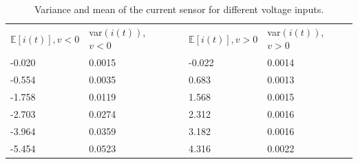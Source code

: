\def\arraystretch{1.2}
\begin{table}[]
\centering
\caption{Variance and mean of the current sensor for different voltage inputs.}
\label{my-label}
\begin{tabular}{lllll}
\cline{1-2} \cline{4-5}
\multicolumn{1}{|l|}{$\mathbb{E}[i(t)], v < 0$} & \multicolumn{1}{l|}{var$(i(t))$, $v<0$} & \multicolumn{1}{l|}{} & \multicolumn{1}{l|}{$\mathbb{E}[i(t)], v >0$} & \multicolumn{1}{l|}{var$(i(t))$, $v>0$} \\ \cline{1-2} \cline{4-5} 
-0.020                                          & 0.0015                                  &                       & -0.022                                        & 0.0014                                  \\
-0.554                                          & 0.0035                                  &                       & 0.683                                         & 0.0013                                  \\
-1.758                                          & 0.0119                                  &                       & 1.568                                         & 0.0015                                  \\
-2.703                                          & 0.0274                                  &                       & 2.312                                         & 0.0016                                  \\
-3.964                                          & 0.0359                                  &                       & 3.182                                         & 0.0016                                  \\
-5.454                                          & 0.0523                                  &                       & 4.316                                         & 0.0022                                  \\ \cline{1-2} \cline{4-5} 
\end{tabular}
\end{table}

